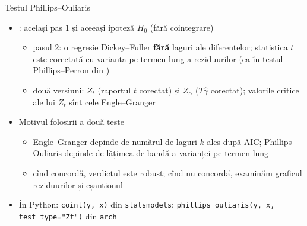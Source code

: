 \begin{frame}{Testul Phillips--Ouliaris}
\itemsize{\small}
\begin{itemize}
    \item {}: același pas 1 și aceeași ipoteză $H_0$ (fără cointegrare)
    \begin{itemize}
        \item pasul 2: o regresie Dickey--Fuller \textbf{fără} laguri ale diferențelor; statistica $t$ este corectată cu varianța pe termen lung a reziduurilor (ca în testul Phillips--Perron din )
        \item două versiuni: $Z_t$ (raportul $t$ corectat) și $Z_\alpha$ ($T\hat\gamma$ corectat); valorile critice ale lui $Z_t$ sînt cele Engle--Granger
    \end{itemize}
    \item Motivul folosirii a două teste
    \begin{itemize}
        \item Engle--Granger depinde de numărul de laguri $k$ ales după AIC; Phillips--Ouliaris depinde de lățimea de bandă a varianței pe termen lung
        \item cînd concordă, verdictul este robust; cînd nu concordă, examinăm graficul reziduurilor și eșantionul
    \end{itemize}
    \item În Python: \texttt{coint(y, x)} din \texttt{statsmodels}; \texttt{phillips\_ouliaris(y, x, test\_type="Zt")} din \texttt{arch}
\end{itemize}
\end{frame}

